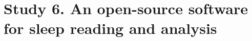 \cleardoublepage

\chapter{Study 6. An open-source software for sleep reading and analysis}
\label{res:software}

\cleardoublepage


